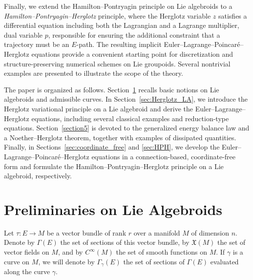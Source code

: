 \documentclass[11pt,a4paper]{article}
\theoremstyle{definition}
\begin{document}
Finally, we extend the Hamilton--Pontryagin principle on Lie algebroids to
a \emph{Hamilton--Pontryagin--Herglotz} principle, where the
Herglotz variable $z$ satisfies a differential equation including both the Lagrangian and a Lagrange multiplier, dual variable $p$, responsible for ensuring the additional constraint that a trajectory must be an $E$-path. The resulting implicit Euler--Lagrange--Poincar\'e--Herglotz equations
provide a convenient starting point for discretization and structure-preserving
numerical schemes on Lie groupoids. Several nontrivial examples are presented to illustrate the scope of the
theory. %

The paper is organized as follows.
Section~\ref{sec:preliminaries} recalls basic notions on Lie algebroids
and admissible curves.
In Section~\ref{sec:Herglotz_LA}, we introduce the Herglotz variational
principle on a Lie algebroid and derive the
Euler--Lagrange--Herglotz equations, including several classical
examples and reduction-type equations.
Section~\ref{section5} is devoted to the generalized energy
balance law and a Noether--Herglotz theorem, together with examples of
dissipated quantities.
Finally, in Sections~\ref{sec:coordinate_free} and \ref{sec:HPH}, we develop the
Euler--Lagrange--Poincar\'e--Herglotz equations in a connection-based,
coordinate-free form and formulate the Hamilton--Pontryagin--Herglotz
principle on a Lie algebroid, respectively.



\section{Preliminaries on Lie Algebroids}\label{sec:preliminaries}


Let $\tau:E \to M$ be a vector bundle of rank $r$ over a manifold $M$ of
dimension $n$. Denote by $\Gamma(E)$ the set of sections of this vector bundle, by $\mathfrak{X}(M)$ the set of vector fields on $M$, and by $C^{\infty}(M)$ the set of smooth functions on $M$. If $\gamma$ is a curve on $M$, we will denote by $\Gamma_{\gamma}(E)$ the  set of sections of $\Gamma(E)$ evaluated along the curve $\gamma$.
\end{document}
